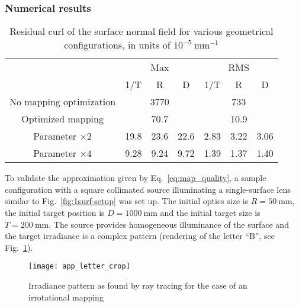 \subsubsection*{Numerical results}
\begin{table*}%
\centering
\begin{tabular}{cc|c|c||c|c|c|}
  \cline{2-7}
\multicolumn{1}{c|}{} & \multicolumn{3}{c||}{Max} & \multicolumn{3}{c|}{RMS} \\ 
\cline{2-7}
\multicolumn{1}{c|}{} & 1/T & R & D & 1/T & R & D \\  \cline{2-7}
\hline 
\multicolumn{1}{|c|}{No mapping optimization} & \multicolumn{3}{c||}{3770} & 
\multicolumn{3}{c|}{733} \\ 
\hline 
\multicolumn{1}{|c|}{Optimized mapping} & \multicolumn{3}{c||}{70.7} & 
\multicolumn{3}{c|}{10.9} \\ 
\hline 
\multicolumn{1}{|c|}{Parameter $\times 2$} & 19.8 &  23.6 & 22.6 & 2.83 & 3.22 & 3.06 \\ 
\hline 
\multicolumn{1}{|c|}{Parameter $\times 4$} & 9.28 &  9.24 & 9.72 & 1.39 & 1.37  &  1.40 \\ 
\hline 
\end{tabular}
\caption{Residual curl of the surface normal field for various geometrical configurations, in units of $10^{-5}\mathrm{~mm^{-1}}$}
\label{tab:map}
\end{table*} 

To validate the approximation given by Eq.~\eqref{eq:map_quality}, a
sample configuration with a square collimated source illuminating a
single-surface lens similar to Fig.~\ref{fig:1surf-setup} was set
up. The initial optics size is $R=50\mathrm{~mm}$, the initial target
position is $D=1000\mathrm{~mm}$ and the initial target size is
$T=200\mathrm{~mm}$. The source provides homogeneous illuminance of
the surface and the target irradiance is a complex pattern (rendering
of the letter ``B'', see Fig.~\ref{fig:letterb}).

\begin{figure}[!htbp]
  \centering 
  \texttt{[image: app\_letter\_crop]}
  \caption{Irradiance pattern as found by ray tracing for the case of
    an irrotational mapping}
  \label{fig:letterb}
\end{figure}

